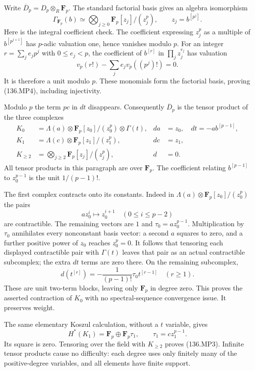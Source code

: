 Write $\overline D_p=D_p\otimes_R\mathbf F_p$.  The standard
factorial basis gives an algebra isomorphism
\[
 \Gamma_{\mathbf F_p}(b)
     \simeq\bigotimes_{j\geq0}\mathbf F_p[z_j]/(z_j^p),
                 \qquad z_j=b^{[p^j]}.                   \tag{136.MP4}
\]
Here is the integral coefficient check.  The coefficient expressing
$z_j^p$ as a multiple of $b^{[p^{j+1}]}$ has $p$-adic valuation
one, hence vanishes modulo $p$.  For an integer
$r=\sum_j e_jp^j$ with $0\leq e_j<p$, the coefficient of $b^{[r]}$
in $\prod_j z_j^{e_j}$ has valuation
\[
 v_p(r!)-\sum_j e_jv_p((p^j)!)=0.
\]
It is therefore a unit modulo $p$.  These monomials form the
factorial basis, proving (136.MP4), including injectivity.

Modulo $p$ the term $pc$ in $dt$ disappears.  Consequently
$\overline D_p$ is the tensor product of the three complexes
\[
 \begin{aligned}
 K_0&=\Lambda(a)\otimes\mathbf F_p[z_0]/(z_0^p)
                  \otimes\Gamma(t),
   &da&=z_0,\quad dt=-a b^{[p-1]},\\
 K_1&=\Lambda(c)\otimes\mathbf F_p[z_1]/(z_1^p),
   &dc&=z_1,\\
 K_{\geq2}&=\bigotimes_{j\geq2}
                          \mathbf F_p[z_j]/(z_j^p),
   &d&=0.
 \end{aligned}                                           \tag{136.MP5}
\]
All tensor products in this paragraph are over $\mathbf F_p$.
The coefficient relating $b^{[p-1]}$ to $z_0^{p-1}$ is the unit
$1/(p-1)!$.

The first complex contracts onto its constants.  Indeed in
$\Lambda(a)\otimes\mathbf F_p[z_0]/(z_0^p)$ the pairs
\[
                   a z_0^i\longmapsto z_0^{i+1}
                        \quad(0\leq i\leq p-2)
\]
are contractible.  The remaining vectors are $1$ and
$\tau_0=a z_0^{p-1}$.  Multiplication by $\tau_0$ annihilates
every nonconstant basis vector: a second $a$ squares to zero,
and a further positive power of $z_0$ reaches $z_0^p=0$.
It follows that tensoring each displayed contractible pair with
$\Gamma(t)$ leaves that pair as an actual contractible subcomplex;
the extra $dt$ terms are zero there.  On the remaining subcomplex,
\[
 d(t^{[r]})=-\frac1{(p-1)!}\tau_0 t^{[r-1]}
                                          \quad(r\geq1).
\]
These are unit two-term blocks, leaving only $\mathbf F_p$ in
degree zero.  This proves the asserted contraction of $K_0$ with
no spectral-sequence convergence issue.  It preserves weight.

The same elementary Koszul calculation, without a $t$ variable,
gives
\[
                 H^*(K_1)=\mathbf F_p\oplus\mathbf F_p\tau_1,
                 \qquad\tau_1=c z_1^{p-1}.
\]
Its square is zero.  Tensoring over the field with $K_{\geq2}$
proves (136.MP3).  Infinite tensor products cause no difficulty:
each degree uses only finitely many of the positive-degree
variables, and all elements have finite support.

